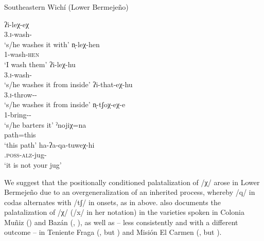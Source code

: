 \ea
Southeastern Wichí (Lower Bermejeño) \citep[110--111]{VN14} \label{lb-esh}\\
    \begin{xlist}
        \ex\gll ʔi-leχ-eχ~\\
                3.{\textsc{i}}-wash-\APPL\\
                \glt `s/he washes it with'
        \ex\gll n̩-leχ-hen~\\
                1-wash-{\textsc{hen}}\\
                \glt `I wash them'
        \ex\gll ʔi-leχ-hu~\\
                3.{\textsc{i}}-wash-\APPL\\
                \glt `s/he washes it from inside'
        \ex\gll ʔi-that-eχ-hu~\\
                3.{\textsc{i}}-throw-\APPL-\APPL\\
                \glt `s/he washes it from inside'
        \ex\gll n̩-tʃoχ-eχ-e~\\
                1-bring-\APPL-\LOC\\
                \glt `s/he barters it'
        \ex\gll ˀnojiχ=na~\\
                path=this\\
                \glt `this path'
        \ex\gll ha-ʔa-qa-tuweχ-hi~\\
                .\textsc{poss}-{\textsc{alz}}-jug-\NEG\\
                \glt `it is not your jug'
    \end{xlist}
\z

We suggest that the positionally conditioned palatalization of /χ/ arose in Lower Bermejeño due to an overgeneralization of an inherited process, whereby /q/ in codas alternates with /tʃ/ in onsets, as in  above. \citet[138--139]{MC09} also documents the palatalization of /χ/ (/x/ in her notation) in the varieties spoken in Colonia Muñiz () and Bazán (, ), as well as -- less consistently and with a different outcome -- in Teniente Fraga (, but ) and Misión El Carmen (, but ).

\subsubsection{} \label{wi-xw}

